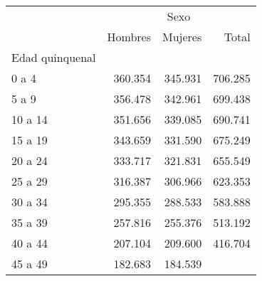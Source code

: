 \begin{tabular}{llll}
\cline{1-4}
\multicolumn{1}{c}{} &
  \multicolumn{3}{|c}{Sexo} \\
\multicolumn{1}{c}{} &
  \multicolumn{1}{|r}{Hombres} &
  \multicolumn{1}{r}{Mujeres} &
  \multicolumn{1}{r}{Total} \\
\cline{1-4}
\multicolumn{1}{l}{Edad quinquenal} &
  \multicolumn{1}{|r}{} &
  \multicolumn{1}{r}{} &
  \multicolumn{1}{r}{} \\
\multicolumn{1}{l}{\hspace{1em}0 a 4} &
  \multicolumn{1}{|r}{360.354} &
  \multicolumn{1}{r}{345.931} &
  \multicolumn{1}{r}{706.285} \\
\multicolumn{1}{l}{\hspace{1em}5 a 9} &
  \multicolumn{1}{|r}{356.478} &
  \multicolumn{1}{r}{342.961} &
  \multicolumn{1}{r}{699.438} \\
\multicolumn{1}{l}{\hspace{1em}10 a 14} &
  \multicolumn{1}{|r}{351.656} &
  \multicolumn{1}{r}{339.085} &
  \multicolumn{1}{r}{690.741} \\
\multicolumn{1}{l}{\hspace{1em}15 a 19} &
  \multicolumn{1}{|r}{343.659} &
  \multicolumn{1}{r}{331.590} &
  \multicolumn{1}{r}{675.249} \\
\multicolumn{1}{l}{\hspace{1em}20 a 24} &
  \multicolumn{1}{|r}{333.717} &
  \multicolumn{1}{r}{321.831} &
  \multicolumn{1}{r}{655.549} \\
\multicolumn{1}{l}{\hspace{1em}25 a 29} &
  \multicolumn{1}{|r}{316.387} &
  \multicolumn{1}{r}{306.966} &
  \multicolumn{1}{r}{623.353} \\
\multicolumn{1}{l}{\hspace{1em}30 a 34} &
  \multicolumn{1}{|r}{295.355} &
  \multicolumn{1}{r}{288.533} &
  \multicolumn{1}{r}{583.888} \\
\multicolumn{1}{l}{\hspace{1em}35 a 39} &
  \multicolumn{1}{|r}{257.816} &
  \multicolumn{1}{r}{255.376} &
  \multicolumn{1}{r}{513.192} \\
\multicolumn{1}{l}{\hspace{1em}40 a 44} &
  \multicolumn{1}{|r}{207.104} &
  \multicolumn{1}{r}{209.600} &
  \multicolumn{1}{r}{416.704} \\
\multicolumn{1}{l}{\hspace{1em}45 a 49} &
  \multicolumn{1}{|r}{182.683} &
  \multicolumn{1}{r}{184.539} &

\end{tabular}
